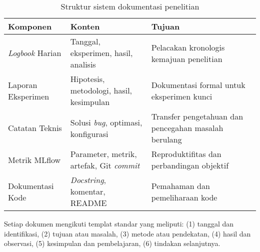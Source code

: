 \documentclass[12pt,a4paper]{article}
\begin{document}
\begin{table}[H]
\centering
\caption{Struktur sistem dokumentasi penelitian}
\label{tab:documentation-system}
\small
\begin{tabular}{|l|p{5cm}|p{5.5cm}|}
\hline
\textbf{Komponen} & \textbf{Konten} & \textbf{Tujuan} \\ \hline
\textit{Logbook} Harian & Tanggal, eksperimen, hasil, analisis & Pelacakan kronologis kemajuan penelitian \\ \hline
Laporan Eksperimen & Hipotesis, metodologi, hasil, kesimpulan & Dokumentasi formal untuk eksperimen kunci \\ \hline
Catatan Teknis & Solusi \textit{bug}, optimasi, konfigurasi & Transfer pengetahuan dan pencegahan masalah berulang \\ \hline
Metrik MLflow & Parameter, metrik, artefak, Git \textit{commit} & Reproduktifitas dan perbandingan objektif \\ \hline
Dokumentasi Kode & \textit{Docstring}, komentar, README & Pemahaman dan pemeliharaan kode \\ \hline
\end{tabular}
\end{table}

Setiap dokumen mengikuti templat standar yang meliputi: (1) tanggal dan identifikasi, (2) tujuan atau masalah, (3) metode atau pendekatan, (4) hasil dan observasi, (5) kesimpulan dan pembelajaran, (6) tindakan selanjutnya.

\end{document}
